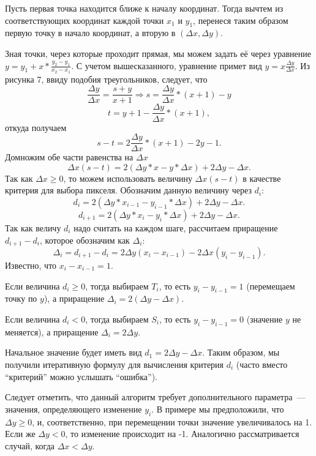 Пусть первая точка находится ближе к началу координат. Тогда вычтем из соответствующих координат каждой точки $x_1$ и $y_1$, перенеся таким образом первую точку в начало координат, а вторую в $(\Delta x, \Delta y)$.

Зная точки, через которые проходит прямая, мы можем задать её через уравнение $y = y_1 + x * \frac {y_2 - y_1} {x_2 - x_1}$. С учетом вышесказанного, уравнение примет вид $y = x \frac{\Delta y}{\Delta x}$. Из рисунка 7, ввиду подобия треугольников, следует, что
\[
    \frac{\Delta y}{\Delta x} = \frac{s + y}{x + 1} \Rightarrow s = \frac{\Delta y}{\Delta x} * (x + 1) - y
\]
\[
    t = y + 1 - \frac{\Delta y}{\Delta x} * (x + 1),
\]
откуда получаем
\[
    s - t = 2 \frac{\Delta y}{\Delta x}*(x+1) - 2y - 1.
\]
Домножим обе части равенства на $\Delta x$
\[
    \Delta x (s - t) = 2(\Delta y * x - y * \Delta x) + 2 \Delta y - \Delta x.
\]
Так как $\Delta x \geq 0$, то можем использовать величину $ \Delta x (s-t) $ в качестве критерия для выбора пикселя. Обозначим данную величину через $d_i:$
\[
    d_i = 2(\Delta y * x_{i-1} - y_{i-1} * \Delta x) + 2 \Delta y - \Delta x.
\]
\[
    d_{i+1} = 2(\Delta y * x_{i} - y_{i} * \Delta x) + 2 \Delta y - \Delta x.
\]
Так как величу $d_i$ надо считать на каждом шаге, рассчитаем приращение $d_{i+1} - d_{i}$, которое обозначим как $\Delta_i$:
\[
    \Delta_i = d_{i+1} - d_i = 2 \Delta y (x_i - x_{i-1}) - 2 \Delta x(y_i - y_{i-1}).
\]
Известно, что $x_i - x_{i-1} = 1$.

Если величина $d_i \geq 0$, тогда выбираем $T_i$, то есть $y_i - y_{i-1} = 1$ (перемещаем точку по $y$), а приращение $\Delta_i = 2 (\Delta y - \Delta x)$.

Если величина $d_i < 0$, тогда выбираем $S_i$, то есть $y_i - y_{i-1} = 0$ (значение $y$ не меняется), а приращение $\Delta_i = 2 \Delta y$.

Начальное значение будет иметь вид $d_1 = 2\Delta y - \Delta x$. Таким образом, мы получили итеративную формулу для вычисления критерия $d_i$ (часто вместо ``критерий'' можно услышать ``ошибка'').

Следует отметить, что данный алгоритм требует дополнительного параметра~--- значения, определяющего изменение $y_i$. В примере мы предположили, что $\Delta y \geq 0$, и, соответственно, при перемещении точки значение увеличивалось на 1. Если же $\Delta y < 0$, то изменение происходит на -1.
Аналогично рассматривается случай, когда $\Delta x < \Delta y$.
